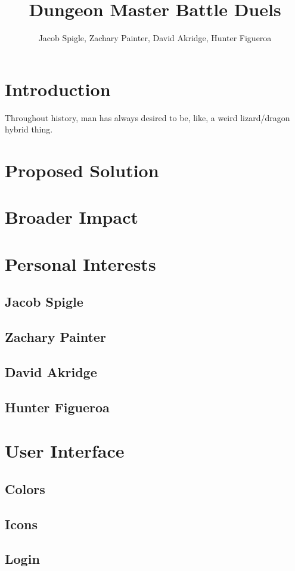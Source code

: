 \documentclass[12pt,a4paper]{report}
\author{Jacob Spigle, Zachary Painter, David Akridge, Hunter Figueroa}
\title{Dungeon Master Battle Duels}
\begin{document}
	
	\maketitle
	
	\tableofcontents
	
	\section{Introduction}
	Throughout history, man has always desired to be, like, a weird lizard/dragon hybrid thing.
	
	\section{Proposed Solution}
	
	\section{Broader Impact}
	
	\section{Personal Interests}
		\subsection{Jacob Spigle}
		\subsection{Zachary Painter}
		\subsection{David Akridge}
		\subsection{Hunter Figueroa}
	
	\section{User Interface}
		\subsection{Colors}
		\subsection{Icons}
		\subsection{Login}
\end{document}
